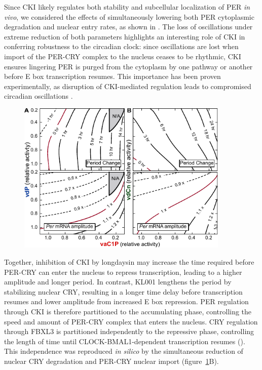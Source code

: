 Since CKI likely regulates both stability and subcellular localization of PER {\it in vivo}, we considered the effects of simultaneously lowering both PER cytoplasmic degradation and nuclear entry rates, as shown in .
The loss of oscillations under extreme reduction of both parameters highlights an interesting role of CKI in conferring robustness to the circadian clock: since oscillations are lost when import of the PER-CRY complex to the nucleus ceases to be rhythmic, CKI ensures lingering PER is purged from the cytoplasm by one pathway or another before E box transcription resumes. 
This importance has been proven experimentally, as disruption of CKI-mediated regulation leads to compromised circadian oscillations \cite{Lee2009a}.


\begin{figure}[h]
  \centering
  \includegraphics[width=0.9\textwidth]{chap4/figures/fig5.pdf}
  \label{fig:45}
\end{figure}

Together, inhibition of CKI by longdaysin may increase the time required before PER-CRY can enter the nucleus to repress transcription, leading to a higher amplitude and longer period. 
In contrast, KL001 lengthens the period by stabilizing nuclear CRY, resulting in a longer time delay before transcription resumes and lower amplitude from increased E box repression. 
PER regulation through CKI is therefore partitioned to the accumulating phase, controlling the speed and amount of PER-CRY complex that enters the nucleus. 
CRY regulation through FBXL3 is partitioned independently to the repressive phase, controlling the length of time until CLOCK-BMAL1-dependent transcription resumes (). 
This independence was reproduced {\it in silico} by the simultaneous reduction of nuclear CRY degradation and PER-CRY nuclear import (figure~\ref{fig:45}B). 

